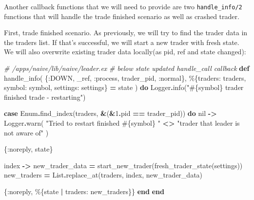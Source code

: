 \documentclass[
  oneside]{book}
\newenvironment{Shaded}{\begin{snugshade}}{\end{snugshade}}
\newcommand{\CommentTok}[1]{\textcolor[rgb]{0.56,0.35,0.01}{\textit{#1}}}
\newcommand{\ConstantTok}[1]{\textcolor[rgb]{0.00,0.00,0.00}{#1}}
\newcommand{\DecValTok}[1]{\textcolor[rgb]{0.00,0.00,0.81}{#1}}
\newcommand{\KeywordTok}[1]{\textcolor[rgb]{0.13,0.29,0.53}{\textbf{#1}}}
\newcommand{\NormalTok}[1]{#1}
\newcommand{\OperatorTok}[1]{\textcolor[rgb]{0.81,0.36,0.00}{\textbf{#1}}}
\newcommand{\OtherTok}[1]{\textcolor[rgb]{0.56,0.35,0.01}{#1}}
\newcommand{\StringTok}[1]{\textcolor[rgb]{0.31,0.60,0.02}{#1}}
\newcommand{\VariableTok}[1]{\textcolor[rgb]{0.00,0.00,0.00}{#1}}
\begin{document}
Another callback functions that we will need to provide are two \texttt{handle\_info/2} functions that will handle the trade finished scenario as well as crashed trader.

First, trade finished scenario. As previously, we will try to find the trader data in the traders list. If that's successful, we will start a new trader with fresh state. We will also overwrite existing trader data locally(as pid, ref and state changed):

\begin{Shaded}
\begin{Highlighting}[]
  \CommentTok{\# /apps/naive/lib/naive/leader.ex}
  \CommentTok{\# below state updated handle\_call callback}
  \KeywordTok{def}\NormalTok{ handle\_info(}
\NormalTok{        \{}\VariableTok{:DOWN}\NormalTok{, \_ref, }\VariableTok{:process}\NormalTok{, trader\_pid, }\VariableTok{:normal}\NormalTok{\},}
\NormalTok{        \%\{}\VariableTok{traders:}\NormalTok{ traders, }\VariableTok{symbol:}\NormalTok{ symbol, }\VariableTok{settings:}\NormalTok{ settings\} }\OperatorTok{=}\NormalTok{ state}
\NormalTok{      ) }\KeywordTok{do}
    \ConstantTok{Logger}\OperatorTok{.}\NormalTok{info(}\StringTok{"}\OtherTok{\#\{}\NormalTok{symbol}\OtherTok{\}}\StringTok{ trader finished trade {-} restarting"}\NormalTok{)}

    \KeywordTok{case} \ConstantTok{Enum}\OperatorTok{.}\NormalTok{find\_index(traders, }\OperatorTok{\&}\NormalTok{(}\OperatorTok{\&}\DecValTok{1}\OperatorTok{.}\NormalTok{pid }\OperatorTok{==}\NormalTok{ trader\_pid)) }\KeywordTok{do}
      \ConstantTok{nil} \OperatorTok{{-}\textgreater{}}
        \ConstantTok{Logger}\OperatorTok{.}\NormalTok{warn(}
          \StringTok{"Tried to restart finished }\OtherTok{\#\{}\NormalTok{symbol}\OtherTok{\}}\StringTok{ "} \OperatorTok{\textless{}\textgreater{}}
            \StringTok{"trader that leader is not aware of"}
\NormalTok{        )}

\NormalTok{        \{}\VariableTok{:noreply}\NormalTok{, state\}}

\NormalTok{      index }\OperatorTok{{-}\textgreater{}}
\NormalTok{        new\_trader\_data }\OperatorTok{=}\NormalTok{ start\_new\_trader(fresh\_trader\_state(settings))}
\NormalTok{        new\_traders }\OperatorTok{=} \ConstantTok{List}\OperatorTok{.}\NormalTok{replace\_at(traders, index, new\_trader\_data)}

\NormalTok{        \{}\VariableTok{:noreply}\NormalTok{, \%\{state }\OperatorTok{|} \VariableTok{traders:}\NormalTok{ new\_traders\}\}}
    \KeywordTok{end}
  \KeywordTok{end}
\end{Highlighting}
\end{Shaded}
\end{document}
